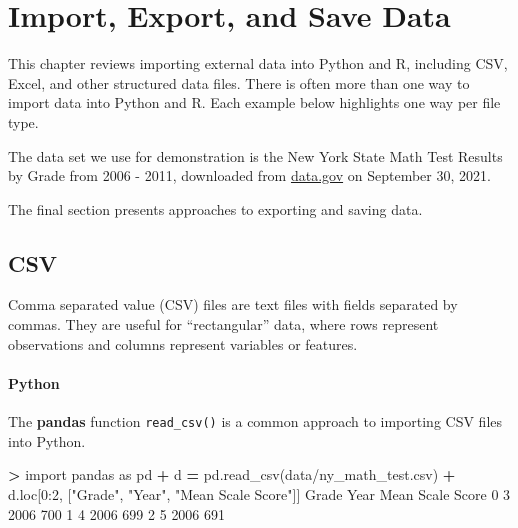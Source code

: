 \documentclass[
]{book}
\newenvironment{Shaded}{\begin{snugshade}}{\end{snugshade}}
\newcommand{\DecValTok}[1]{\textcolor[rgb]{0.00,0.00,0.81}{#1}}
\newcommand{\ImportTok}[1]{#1}
\newcommand{\NormalTok}[1]{#1}
\newcommand{\OperatorTok}[1]{\textcolor[rgb]{0.81,0.36,0.00}{\textbf{#1}}}
\newcommand{\StringTok}[1]{\textcolor[rgb]{0.31,0.60,0.02}{#1}}
\begin{document}
\hypertarget{import-export-and-save-data}{%
\chapter{Import, Export, and Save Data}\label{import-export-and-save-data}}

This chapter reviews importing external data into Python and R, including CSV, Excel, and other structured data files. There is often more than one way to import data into Python and R. Each example below highlights one way per file type.

The data set we use for demonstration is the New York State Math Test Results by Grade from 2006 - 2011, downloaded from \href{https://catalog.data.gov/dataset/2006-2011-nys-math-test-results-by-grade-citywide-by-race-ethnicity}{data.gov} on September 30, 2021.

The final section presents approaches to exporting and saving data.

\hypertarget{csv}{%
\section{CSV}\label{csv}}

Comma separated value (CSV) files are text files with fields separated by commas. They are useful for ``rectangular'' data, where rows represent observations and columns represent variables or features.

\hypertarget{python-12}{%
\subsubsection*{Python}\label{python-12}}

The \textbf{pandas} function \texttt{read\_csv()} is a common approach to importing CSV files into Python.

\begin{Shaded}
\begin{Highlighting}[]
\OperatorTok{\textgreater{}} \ImportTok{import}\NormalTok{ pandas }\ImportTok{as}\NormalTok{ pd}
\OperatorTok{+}\NormalTok{ d }\OperatorTok{=}\NormalTok{ pd.read\_csv(}\StringTok{\textquotesingle{}data/ny\_math\_test.csv\textquotesingle{}}\NormalTok{)}
\OperatorTok{+}\NormalTok{ d.loc[}\DecValTok{0}\NormalTok{:}\DecValTok{2}\NormalTok{, [}\StringTok{"Grade"}\NormalTok{, }\StringTok{"Year"}\NormalTok{, }\StringTok{"Mean Scale Score"}\NormalTok{]]}
\NormalTok{  Grade  Year  Mean Scale Score}
\DecValTok{0}     \DecValTok{3}  \DecValTok{2006}               \DecValTok{700}
\DecValTok{1}     \DecValTok{4}  \DecValTok{2006}               \DecValTok{699}
\DecValTok{2}     \DecValTok{5}  \DecValTok{2006}               \DecValTok{691}
\end{Highlighting}
\end{Shaded}
\end{document}
